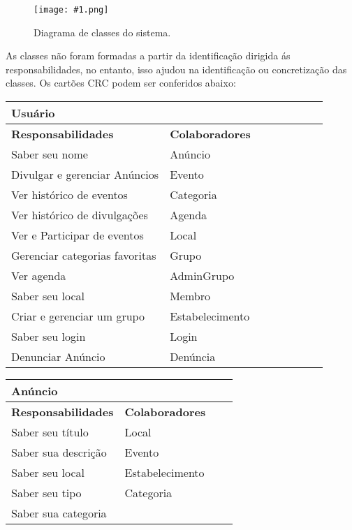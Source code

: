 \documentclass{article}
\newcommand{\diagrama}[2]
{
 \begin{figure}[H]
 \begin{center}
 \texttt{[image: \#1.png]}
 \end{center}
 \caption{#2}
 \label{fig:#1}
 \end{figure}
}
\begin{document}
\diagrama{Diagrama}{Diagrama de classes do sistema.} 

\pagebreak

As classes não foram formadas a partir da identificação dirigida ás responsabilidades, no entanto, isso ajudou na identificação ou concretização das classes. Os cartões CRC podem ser conferidos abaixo:

		\begin{center}
   	 \begin{tabular}{|p{0.5\linewidth}|p{0.5\linewidth}|}
\hline
 	\multicolumn{2}{|p{\textwidth}|}{
{\large \textbf{Usuário}}
}  \\
\hline
\textbf{Responsabilidades} & \textbf{Colaboradores} \\ 
\hline
  	Saber seu nome &  Anúncio \\
  	\hline
  	Divulgar e gerenciar Anúncios & Evento \\
  	\hline
  	Ver histórico de eventos & Categoria \\
  	\hline
  	Ver histórico de divulgações & Agenda \\
  	\hline
  	Ver e Participar de eventos & Local \\
  	\hline
  	Gerenciar categorias favoritas & Grupo \\
  	\hline
  	Ver agenda &  AdminGrupo \\
  	\hline
  	Saber seu local &  Membro \\ 
  	\hline
  	Criar e gerenciar um grupo &  Estabelecimento \\
\hline
Saber seu login & Login \\
\hline
Denunciar Anúncio & Denúncia \\			  
    \hline
   	\end{tabular} 
    \end{center}
    
    
    \begin{center}
   	 \begin{tabular}{|p{0.5\linewidth}|p{0.5\linewidth}|}
\hline
 	\multicolumn{2}{|p{\textwidth}|}{
{\large \textbf{Anúncio}}
}  \\
\hline
\textbf{Responsabilidades} & \textbf{Colaboradores} \\ 
\hline
  	Saber seu título & Local  \\
  	\hline
  	Saber sua descrição & Evento \\
  	\hline
  	Saber seu local & Estabelecimento \\
  	\hline
  	Saber seu tipo & Categoria \\
  	\hline
  	Saber sua categoria &   \\
  	\hline
   	\end{tabular} 
    \end{center}
    
\end{document}
